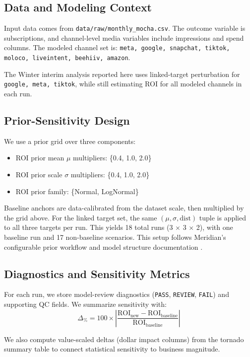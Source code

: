 ﻿\documentclass[11pt]{article}
\begin{document}
\subsection*{Data and Modeling Context}
Input data comes from \texttt{data/raw/monthly\_mocha.csv}. The outcome variable is subscriptions, and channel-level media variables include impressions and spend columns. The modeled channel set is:
\texttt{meta, google, snapchat, tiktok, moloco, liveintent, beehiiv, amazon}.

The Winter interim analysis reported here uses linked-target perturbation for \texttt{google, meta, tiktok}, while still estimating ROI for all modeled channels in each run.

\subsection*{Prior-Sensitivity Design}
We use a prior grid over three components:
\begin{itemize}
  \item ROI prior mean $\mu$ multipliers: \{0.4, 1.0, 2.0\}
  \item ROI prior scale $\sigma$ multipliers: \{0.4, 1.0, 2.0\}
  \item ROI prior family: \{Normal, LogNormal\}
\end{itemize}

Baseline anchors are data-calibrated from the dataset scale, then multiplied by the grid above. For the linked target set, the same $(\mu, \sigma, \text{dist})$ tuple is applied to all three targets per run. This yields 18 total runs (3 $\times$ 3 $\times$ 2), with one baseline run and 17 non-baseline scenarios. This setup follows Meridian's configurable prior workflow and model structure documentation \cite{meridian_configure,meridian_model_spec}.

\subsection*{Diagnostics and Sensitivity Metrics}
For each run, we store model-review diagnostics (\texttt{PASS}, \texttt{REVIEW}, \texttt{FAIL}) and supporting QC fields. We summarize sensitivity with:
\[
\Delta_{\%} = 100 \times \left|\frac{\text{ROI}_{\text{new}} - \text{ROI}_{\text{baseline}}}{\text{ROI}_{\text{baseline}}}\right|
\]

We also compute value-scaled deltas (dollar impact columns) from the tornado summary table to connect statistical sensitivity to business magnitude.
\end{document}
